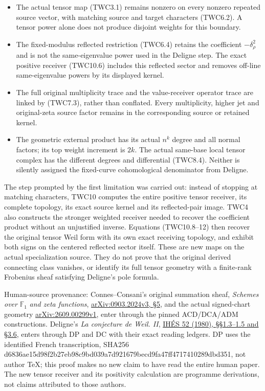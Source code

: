 \begin{itemize}
\tightlist
\item
  The actual tensor map (TWC3.1) remains nonzero on every nonzero
  repeated source vector, with matching source and target characters
  (TWC6.2). A tensor power alone does not produce disjoint weights for
  this boundary.
\item
  The fixed-modulus reflected restriction (TWC6.4) retains the
  coefficient \(-\delta_\rho^2\) and is not the same-eigenvalue power
  used in the Deligne step. The exact positive receiver (TWC10.6)
  includes this reflected sector and removes off-line same-eigenvalue
  powers by its displayed kernel.
\item
  The full original multiplicity trace and the value-receiver operator
  trace are linked by (TWC7.3), rather than conflated. Every
  multiplicity, higher jet and original-zeta source factor remains in
  the corresponding source or retained kernel.
\item
  The geometric external product has its actual \(n^k\) degree and all
  normal factors; its top weight increment is \(2k\). The actual
  same-base local tensor complex has the different degrees and
  differential (TWC8.4). Neither is silently assigned the fixed-curve
  cohomological denominator from Deligne.
\end{itemize}

The step prompted by the first limitation was carried out: instead of
stopping at matching characters, TWC10 computes the entire positive
tensor receiver, its complete topology, its exact source kernel and its
reflected-pair image. TWC4 also constructs the stronger weighted
receiver needed to recover the coefficient product without an
unjustified inverse. Equations (TWC10.8--12) then recover the original
tensor Weil form with its own exact receiving topology, and exhibit both
signs on the centered reflected sector itself. These are new maps on the
actual specialization source. They do not prove that the original
derived connecting class vanishes, or identify its full tensor geometry
with a finite-rank Frobenius sheaf satisfying Deligne's pole formula.

Human-source provenance: Connes--Consani's original summation sheaf,
\emph{Schemes over} \(\mathbb F_1\) \emph{and zeta functions},
\href{https://arxiv.org/abs/0903.2024v3}{arXiv:0903.2024v3, §5}, and the
actual signed-chart geometry
\href{https://arxiv.org/abs/2609.00299v1}{arXiv:2609.00299v1}, enter
through the pinned ACD/DCA/ADM constructions. Deligne's \emph{La
conjecture de Weil. II},
\href{https://numdam.org/item/PMIHES_1980__52__137_0/}{IHÉS 52 (1980),
§§1.3--1.5 and §3.6}, enters through DP and DC with their exact reading
ledgers. DP uses the identified French transcription, SHA256
d6836ae15d98f2b27eb98c9bd039a7d921679becd9fa47ff4717410289dbd351, not
author TeX; this proof makes no new claim to have read the entire human
paper. The new tensor receiver and its positivity calculation are
programme derivations, not claims attributed to those authors.

